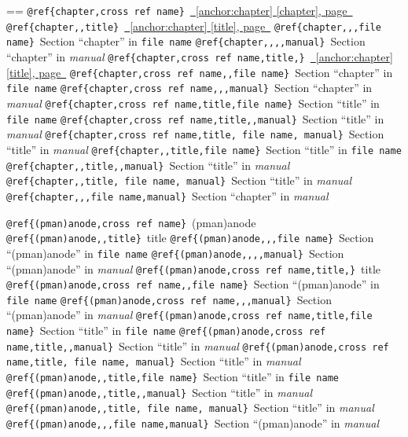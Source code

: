 \documentclass{book}
\makeatletter
\newenvironment{GNUTexinfopreformatted}{%
  \par\GNUTobeylines\obeyspaces\frenchspacing
  \parskip=\z@\parindent=\z@}{}
{\catcode`\^^M=13 \gdef\GNUTobeylines{\catcode`\^^M=13 \def^^M{\null\par}}}
\newenvironment{GNUTexinfoindented}
  {\begin{list}{}{}
  \item\relax}
  {\end{list}}
\makeatother
\begin{document}
\begin{GNUTexinfoindented}
\begin{GNUTexinfopreformatted}
\texttt{@ref\{chapter,cross ref name\}}\ \hyperref[anchor:chapter]{\chaptername~\ref*{anchor:chapter} [chapter], page~\pageref*{anchor:chapter}}
\texttt{@ref\{chapter{,}{,}title\}}\ \hyperref[anchor:chapter]{\chaptername~\ref*{anchor:chapter} [title], page~\pageref*{anchor:chapter}}
\texttt{@ref\{chapter{,}{,},file name\}}\ Section ``chapter'' in \texttt{file name}
\texttt{@ref\{chapter{,}{,}{,}{,}manual\}}\ Section ``chapter'' in \textsl{manual}
\texttt{@ref\{chapter,cross ref name,title,\}}\ \hyperref[anchor:chapter]{\chaptername~\ref*{anchor:chapter} [title], page~\pageref*{anchor:chapter}}
\texttt{@ref\{chapter,cross ref name{,}{,}file name\}}\ Section ``chapter'' in \texttt{file name}
\texttt{@ref\{chapter,cross ref name{,}{,},manual\}}\ Section ``chapter'' in \textsl{manual}
\texttt{@ref\{chapter,cross ref name,title,file name\}}\ Section ``title'' in \texttt{file name}
\texttt{@ref\{chapter,cross ref name,title{,}{,}manual\}}\ Section ``title'' in \textsl{manual}
\texttt{@ref\{chapter,cross ref name,title,\ file name,\ manual\}}\ Section ``title'' in \textsl{manual}
\texttt{@ref\{chapter{,}{,}title,file name\}}\ Section ``title'' in \texttt{file name}
\texttt{@ref\{chapter{,}{,}title{,}{,}manual\}}\ Section ``title'' in \textsl{manual}
\texttt{@ref\{chapter{,}{,}title,\ file name,\ manual\}}\ Section ``title'' in \textsl{manual}
\texttt{@ref\{chapter{,}{,},file name,manual\}}\ Section ``chapter'' in \textsl{manual}


\texttt{@ref\{(pman)anode,cross ref name\}}\ (pman)anode
\texttt{@ref\{(pman)anode{,}{,}title\}}\ title
\texttt{@ref\{(pman)anode{,}{,},file name\}}\ Section ``(pman)anode'' in \texttt{file name}
\texttt{@ref\{(pman)anode{,}{,}{,}{,}manual\}}\ Section ``(pman)anode'' in \textsl{manual}
\texttt{@ref\{(pman)anode,cross ref name,title,\}}\ title
\texttt{@ref\{(pman)anode,cross ref name{,}{,}file name\}}\ Section ``(pman)anode'' in \texttt{file name}
\texttt{@ref\{(pman)anode,cross ref name{,}{,},manual\}}\ Section ``(pman)anode'' in \textsl{manual}
\texttt{@ref\{(pman)anode,cross ref name,title,file name\}}\ Section ``title'' in \texttt{file name}
\texttt{@ref\{(pman)anode,cross ref name,title{,}{,}manual\}}\ Section ``title'' in \textsl{manual}
\texttt{@ref\{(pman)anode,cross ref name,title,\ file name,\ manual\}}\ Section ``title'' in \textsl{manual}
\texttt{@ref\{(pman)anode{,}{,}title,file name\}}\ Section ``title'' in \texttt{file name}
\texttt{@ref\{(pman)anode{,}{,}title{,}{,}manual\}}\ Section ``title'' in \textsl{manual}
\texttt{@ref\{(pman)anode{,}{,}title,\ file name,\ manual\}}\ Section ``title'' in \textsl{manual}
\texttt{@ref\{(pman)anode{,}{,},file name,manual\}}\ Section ``(pman)anode'' in \textsl{manual}



\end{GNUTexinfopreformatted}
\end{GNUTexinfoindented}
\end{document}

